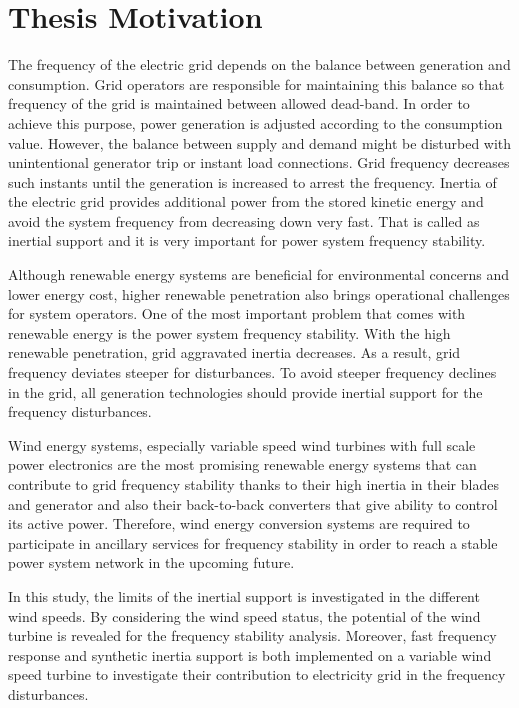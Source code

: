 \section{Thesis Motivation}
The frequency of the electric grid depends on the balance between generation and consumption. Grid operators are responsible for maintaining this balance so that frequency of the grid is maintained between allowed dead-band. In order to achieve this purpose, power generation is adjusted according to the consumption value. However, the balance between supply and demand might be disturbed with unintentional generator trip or instant load connections. Grid frequency decreases such instants until the generation is increased to arrest the frequency. Inertia of the electric grid provides additional power from the stored kinetic energy and avoid the system frequency from decreasing down very fast. That is called as inertial support and it is very important for power system frequency stability.\par
Although renewable energy systems are beneficial for environmental concerns and lower energy cost, higher renewable penetration also brings operational challenges for system operators. One of the most important problem that comes with renewable energy is the power system frequency stability. With the high renewable penetration, grid aggravated inertia decreases. As a result, grid frequency deviates steeper for disturbances. To avoid steeper frequency declines in the grid, all generation technologies should provide inertial support for the frequency disturbances.\par
Wind energy systems, especially variable speed wind turbines with full scale power electronics are the most promising renewable energy systems that can contribute to grid frequency stability thanks to their high inertia in their blades and generator and also their back-to-back converters that give ability to control its active power. Therefore, wind energy conversion systems are required to participate in ancillary services for frequency stability in order to reach a stable power system network in the upcoming future. \par
In this study, the limits of the inertial support is investigated in the different wind speeds. By considering the wind speed status, the potential of the wind turbine is revealed for the frequency stability analysis. Moreover, fast frequency response and synthetic inertia support is both implemented on a variable wind speed turbine to investigate their contribution to electricity grid in the frequency disturbances. 

